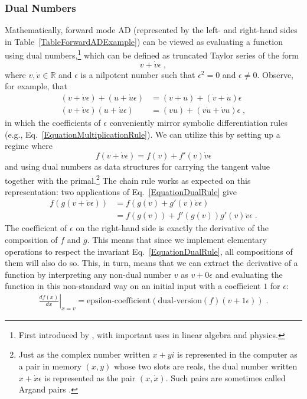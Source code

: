 \documentclass[twoside,11pt]{article}
\begin{document}
\subsubsection{Dual Numbers}
\label{SectionDualNumbers}
Mathematically, forward mode AD (represented by the left- and right-hand sides in Table~\ref{TableForwardADExample}) can be viewed as evaluating a function using dual numbers,\footnote{First introduced by \citet{Clifford1873}, with important uses in linear algebra and physics.} which can be defined as truncated Taylor series of the form
\begin{equation*}
  v + \dot{v}\epsilon \;,
\end{equation*}
where $v, \dot{v} \in \mathbb{R}$ and $\epsilon$ is a nilpotent number such
that $\epsilon^2 = 0$ and $\epsilon \neq 0$. Observe, for example, that
\begin{align*}
  (v + \dot{v}\epsilon) + (u + \dot{u}\epsilon) &= (v + u) + (\dot{v} + \dot{u})\epsilon\\
  (v + \dot{v}\epsilon)(u + \dot{u}\epsilon) &= (vu) + (v\dot{u} + \dot{v}u)\epsilon\;,
\end{align*}
in which the coefficients of $\epsilon$ conveniently mirror symbolic differentiation rules (e.g., Eq.~\ref{EquationMultiplicationRule}). We can utilize this by setting up a regime where
\begin{equation}\label{EquationDualRule}
  f(v + \dot{v}\epsilon) = f(v) + f'(v)\dot{v}\epsilon
\end{equation}
and using dual numbers as data structures for carrying the tangent value together with the primal.\footnote{Just as the complex number written $x + y i$ is represented in the computer as a pair in memory $(x, y)$ whose two slots are reals, the dual number written $x + \dot{x}\epsilon$ is represented as the pair $(x, \dot{x})$. Such pairs are sometimes called Argand pairs \citep[][p107 Eqs.~(157) and (158)]{Hamilton1837}.} The chain rule works as expected on this representation: two applications of Eq.~\ref{EquationDualRule} give
\begin{align*}
  f(g(v + \dot{v}\epsilon)) &= f(g(v) + g'(v)\dot{v}\epsilon)\\
  &= f(g(v)) + f'(g(v))g'(v)\dot{v}\epsilon\;.
\end{align*}
The coefficient of $\epsilon$ on the right-hand side is exactly the derivative of the composition of $f$ and $g$. This means that since we implement elementary operations to respect the invariant Eq.~\ref{EquationDualRule}, all compositions of them will also do so. This, in turn, means that we can extract the derivative of a function by interpreting any non-dual number $v$ as $v + 0 \epsilon$ and evaluating the function in this non-standard way on an initial input with a coefficient $1$ for $\epsilon$:
\begin{align*}
\left.\frac{df(x)}{dx}\right|_{x=v} = \textrm{epsilon-coefficient}(\textrm{dual-version}(f)(v + 1\epsilon))\;.
\end{align*}
\end{document}
